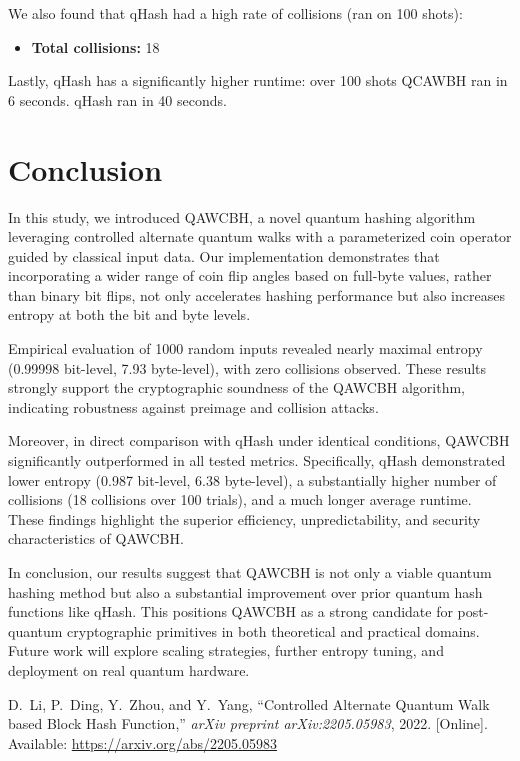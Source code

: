 \documentclass[conference]{IEEEtran}
\begin{document}
We also found that qHash had a high rate of collisions (ran on 100 shots):
\begin{itemize}
    \item \textbf{Total collisions:} 18
\end{itemize}

Lastly, qHash has a significantly higher runtime: over 100 shots QCAWBH ran in 6 seconds. qHash ran in 40 seconds.

\section{Conclusion}

In this study, we introduced QAWCBH, a novel quantum hashing algorithm leveraging controlled alternate quantum walks with a parameterized coin operator guided by classical input data. Our implementation demonstrates that incorporating a wider range of coin flip angles based on full-byte values, rather than binary bit flips, not only accelerates hashing performance but also increases entropy at both the bit and byte levels.

Empirical evaluation of 1000 random inputs revealed nearly maximal entropy (0.99998 bit-level, 7.93 byte-level), with zero collisions observed. These results strongly support the cryptographic soundness of the QAWCBH algorithm, indicating robustness against preimage and collision attacks.

Moreover, in direct comparison with qHash under identical conditions, QAWCBH significantly outperformed in all tested metrics. Specifically, qHash demonstrated lower entropy (0.987 bit-level, 6.38 byte-level), a substantially higher number of collisions (18 collisions over 100 trials), and a much longer average runtime. These findings highlight the superior efficiency, unpredictability, and security characteristics of QAWCBH.

In conclusion, our results suggest that QAWCBH is not only a viable quantum hashing method but also a substantial improvement over prior quantum hash functions like qHash. This positions QAWCBH as a strong candidate for post-quantum cryptographic primitives in both theoretical and practical domains. Future work will explore scaling strategies, further entropy tuning, and deployment on real quantum hardware.

\begin{thebibliography}{1}

D.~Li, P.~Ding, Y.~Zhou, and Y.~Yang, ``Controlled Alternate Quantum Walk based Block Hash Function,'' \textit{arXiv preprint arXiv:2205.05983}, 2022. [Online]. Available: \url{https://arxiv.org/abs/2205.05983}

\end{thebibliography}
\end{document}
